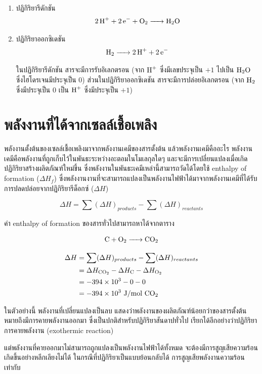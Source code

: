 \documentclass[a4paper,nobib,openany,10pt]{tufte-book}
\begin{document}
\begin{enumerate}
\item ปฏิกิริยารีดักชัน
\label{sec:orgbdd879b}
\[ \ce{2H^+ + 2e^- + O2 -> H_2O}\]

\item ปฏิกิริยาออกซิเดชัน
\label{sec:org9ab8b66}
\[ \ce{H2 -> 2H^+ + 2e^-}\]

ในปฏิกิริยารีดักชัน สารจะมีการรับอิเลกตรอน (จาก \(\ce{H^+}\) ซึ่งมีเลขประจุเป็น \(+1\) ไปเป็น \(\ce{H2O}\) ซึ่งไฮโดรเจนมีประจุเป็น 0) ส่วนในปฏิกิริยาออกซิเดชัน สารจะมีการปล่อยอิเลกตรอน (จาก \(\ce{H2}\) ซึ่งมีประจุเป็น 0 เป็น \(\ce{H^+}\) ซึ่งมีประจุเป็น \(+1\))
\end{enumerate}

\section{พลังงานที่ได้จากเซลล์เชื้อเพลิง}
\label{sec:orgcb4c0aa}
พลังงานตั้งต้นของเซลล์เชื้อเพลิงมาจากพลังงานเคมีของสารตั้งต้น
แล้วพลังงานเคมีคืออะไร
พลังงานเคมีคือพลังงานที่ถูกเก็บไว้ในพันธะระหว่างอะตอมในโมเลกุลใดๆ
และจะมีการเปลี่ยนแปลงเมื่อเกิดปฏิกิริยาสร้างผลิตภัณฑ์ใหม่ขึ้น
ซึ่งพลังงานในพันธะเคมีเหล่านี้สามารถวัดได้โดยใช้ enthalpy of formation
(\(\Delta H_f\))
ซึ่งพลังงานงานที่จะสามารถแปลงเป็นพลังงานไฟฟ้าได้มาจากพลังงานเคมีที่ได้รับการปลดปล่อยจากปฏิกิริยารีด็อกซ์
(\(\Delta H\))

\[\Delta H = \sum (\Delta H)_{products} - \sum (\Delta H)_{reactants}\]

ค่า enthalpy of formation ของสารทั่วไปสามารถหาได้จากตาราง

\[\ce{C + O2 -> CO_2}\]

\[\begin{aligned}
  \Delta H &= \sum (\Delta H)_{products} - \sum (\Delta H)_{reactants} \\
           &= \Delta H_{\ce{CO2}} - \Delta H_{\ce{C}} - \Delta H_{\ce{O2}} \\
           &= -394 \times 10^3 - 0 - 0 \\
           &= -394 \times 10^3 \text{ J/mol } \ce{CO2} \end{aligned}\]

ในตัวอย่างนี้ พลังงานที่เปลี่ยนแปลงเป็นลบ
แสดงว่าพลังงานของผลิตภัณฑ์น้อยกว่าของสารตั้งต้น
หมายถึงมีการคายพลังงานออกมา ซึ่งเป็นปกติสำหรับปฏิกิริยาสันดาปทั่วไป
เรียกได้อีกอย่างว่าปฏิกิริยาการคายพลังงาน (exothermic reaction)

แต่พลังงานที่คายออกมาไม่สามารถถูกแปลงเป็นพลังงานไฟฟ้าได้ทั้งหมด
จะต้องมีการสูญเสียความร้อนเกิดขึ้นอย่างหลีกเลียงไม่ได้
ในกรณีที่ปฏิกิริยาเป็นแบบย้อนกลับได้ การสูญเสียพลังงานความร้อนเท่ากับ
\end{document}
